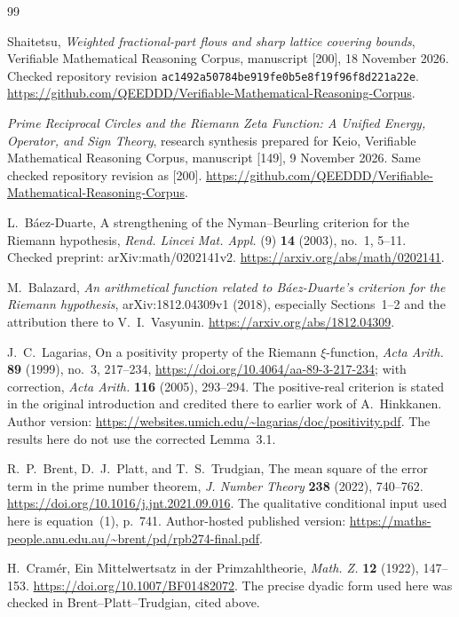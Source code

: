 \documentclass[11pt,a4paper]{article}
\theoremstyle{definition}\newtheorem{definition}[theorem]{Definition}
\theoremstyle{remark}\newtheorem{remark}[theorem]{Remark}
\numberwithin{equation}{section}
\begin{document}
\clearpage
{}
\begin{thebibliography}{99}

Shaitetsu,
\emph{Weighted fractional-part flows and sharp lattice covering bounds},
Verifiable Mathematical Reasoning Corpus, manuscript [200],
18 November 2026. Checked repository revision
\texttt{ac1492a50784be919fe0b5e8f19f96f8d221a22e}.
\url{https://github.com/QEEDDD/Verifiable-Mathematical-Reasoning-Corpus}.


\emph{Prime Reciprocal Circles and the Riemann Zeta Function:
A Unified Energy, Operator, and Sign Theory},
research synthesis prepared for Keio,
Verifiable Mathematical Reasoning Corpus, manuscript [149],
9 November 2026. Same checked repository revision as [200].
\url{https://github.com/QEEDDD/Verifiable-Mathematical-Reasoning-Corpus}.


L.~B\'aez-Duarte,
A strengthening of the Nyman--Beurling criterion for the Riemann hypothesis,
\emph{Rend. Lincei Mat. Appl.} (9) \textbf{14} (2003), no.~1, 5--11.
Checked preprint: arXiv:math/0202141v2.
\url{https://arxiv.org/abs/math/0202141}.


M.~Balazard,
\emph{An arithmetical function related to B\'aez-Duarte's criterion
for the Riemann hypothesis}, arXiv:1812.04309v1 (2018),
especially Sections~1--2 and the attribution there to V.~I.~Vasyunin.
\url{https://arxiv.org/abs/1812.04309}.


J.~C.~Lagarias,
On a positivity property of the Riemann $\xi$-function,
\emph{Acta Arith.} \textbf{89} (1999), no.~3, 217--234,
\url{https://doi.org/10.4064/aa-89-3-217-234};
with correction, \emph{Acta Arith.} \textbf{116} (2005), 293--294.
The positive-real criterion is stated in the original introduction
and credited there to earlier work of A.~Hinkkanen.
Author version:
\url{https://websites.umich.edu/~lagarias/doc/positivity.pdf}.
The results here do not use the corrected Lemma~3.1.


R.~P.~Brent, D.~J.~Platt, and T.~S.~Trudgian,
The mean square of the error term in the prime number theorem,
\emph{J. Number Theory} \textbf{238} (2022), 740--762.
\url{https://doi.org/10.1016/j.jnt.2021.09.016}.
The qualitative conditional input used here is equation~(1), p.~741.
Author-hosted published version:
\url{https://maths-people.anu.edu.au/~brent/pd/rpb274-final.pdf}.


H.~Cram\'er,
Ein Mittelwertsatz in der Primzahltheorie,
\emph{Math. Z.} \textbf{12} (1922), 147--153.
\url{https://doi.org/10.1007/BF01482072}.
The precise dyadic form used here was checked in
Brent--Platt--Trudgian, cited above.



\end{thebibliography}
\end{document}
